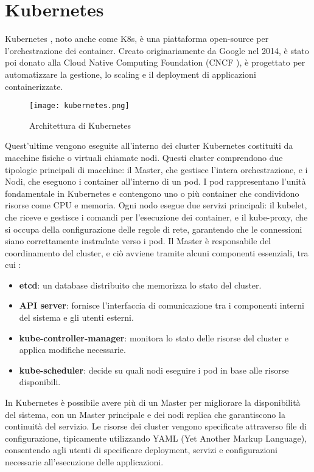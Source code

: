\section{Kubernetes}
Kubernetes \cite{kubernetes}, noto anche come K8s, è una piattaforma open-source per l'orchestrazione dei container.
Creato originariamente da Google nel 2014, è stato poi donato alla Cloud Native Computing Foundation (CNCF \cite{cncf}),
è progettato per automatizzare la gestione, lo scaling e il deployment di applicazioni containerizzate.
\begin{figure}[h]
    \centering
   \texttt{[image: kubernetes.png]}
    \caption{Architettura di Kubernetes \cite{kubeart}}
    \label{fig:kube}
\end{figure}
Quest'ultime vengono eseguite all'interno dei cluster Kubernetes costituiti da macchine fisiche o virtuali chiamate nodi. 
Questi cluster comprendono due tipologie principali di macchine: il Master, che gestisce l'intera orchestrazione, e i Nodi, che eseguono i container all'interno di un pod.
I pod rappresentano l'unità fondamentale in Kubernetes e contengono uno o più container che condividono risorse come CPU e memoria.
Ogni nodo esegue due servizi principali: il kubelet, che riceve e gestisce i comandi per l'esecuzione dei container, 
e il kube-proxy, che si occupa della configurazione delle regole di rete, garantendo che le connessioni siano correttamente instradate verso i pod.
Il Master è responsabile del coordinamento del cluster, e ciò avviene tramite alcuni componenti essenziali, tra cui \cite{kubeart}:
\begin{itemize}
    \item \textbf{etcd}: un database distribuito che memorizza lo stato del cluster.
    \item \textbf{API server}: fornisce l'interfaccia di comunicazione tra i componenti interni del sistema e gli utenti esterni.
    \item \textbf{kube-controller-manager}: monitora lo stato delle risorse del cluster e applica modifiche necessarie.
    \item \textbf{kube-scheduler}: decide su quali nodi eseguire i pod in base alle risorse disponibili.
\end{itemize}
In Kubernetes è possibile avere più di un Master per migliorare la disponibilità del sistema, con un Master principale e dei nodi replica che garantiscono la continuità del servizio.
Le risorse dei cluster vengono specificate attraverso file di configurazione, tipicamente utilizzando YAML (Yet Another Markup Language), consentendo agli utenti di specificare deployment, servizi e configurazioni necessarie all'esecuzione delle applicazioni.
